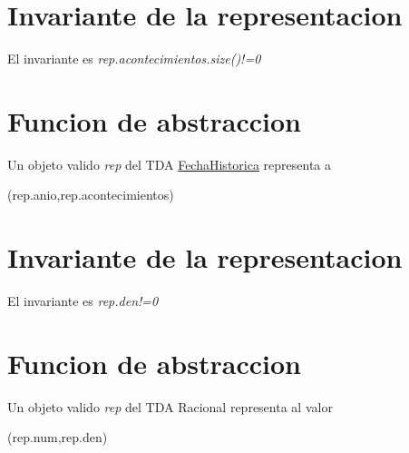 \hypertarget{repConjunto_invConjunto}{}\section{Invariante de la representacion}\label{repConjunto_invConjunto}
El invariante es {\itshape rep.\+acontecimientos.\+size()!=0} \hypertarget{repConjunto_faConjunto}{}\section{Funcion de abstraccion}\label{repConjunto_faConjunto}
Un objeto valido {\itshape rep} del T\+DA \hyperlink{classFechaHistorica}{Fecha\+Historica} representa a

(rep.\+anio,rep.\+acontecimientos)\hypertarget{repConjunto_invConjunto}{}\section{Invariante de la representacion}\label{repConjunto_invConjunto}
El invariante es {\itshape rep.\+den!=0} \hypertarget{repConjunto_faConjunto}{}\section{Funcion de abstraccion}\label{repConjunto_faConjunto}
Un objeto valido {\itshape rep} del T\+DA Racional representa al valor

(rep.\+num,rep.\+den) 